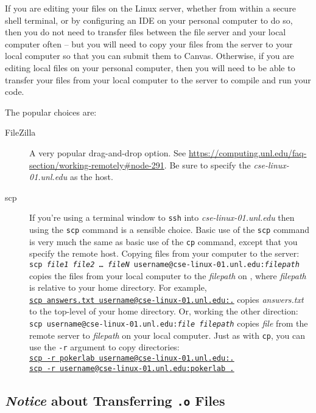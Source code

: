 If you are editing your files on the Linux server, whether from within a secure shell terminal, or by configuring an IDE on your personal computer to do so,
then you do not need to transfer files between the file server and your local computer often -- but you will need to copy your files from the server to your local computer so that you can submit them to Canvas.
Otherwise, if you are editing local files on your personal computer, then you will need to be able to transfer your files from your local computer to the server to compile and run your code.

The popular choices are:
\begin{description}
    \item[FileZilla] A very popular drag-and-drop option.
        See \url{https://computing.unl.edu/faq-section/working-remotely#node-291}.
        Be sure to specify the \textit{cse-linux-01.unl.edu} as the host.
    \item[scp] If you're using a terminal window to \texttt{ssh} into \textit{cse-linux-01.unl.edu} then using the \texttt{scp} command is a sensible choice.
        Basic use of the \texttt{scp} command is very much the same as basic use of the \texttt{cp} command, except that you specify the remote host.
        Copying files from your computer to the server: \\
        \texttt{scp \textit{file1} \textit{file2} \dots\ \textit{fileN} username@cse-linux-01.unl.edu:\textit{filepath}} copies the files from your local computer to the \textit{filepath} on \runtimeenvironment, where \textit{filepath} is relative to your home directory.
        For example, \\
        \underline{\underline{\texttt{scp answers.txt username@cse-linux-01.unl.edu:.}}} copies \textit{answers.txt} to the top-level of your home directory.
        Or, working the other direction: \\
        \texttt{scp username@cse-linux-01.unl.edu:\textit{file} \textit{filepath}} copies \textit{file} from the remote server to \textit{filepath} on your local computer.
        Just as with \texttt{cp}, you can use the \texttt{-r} argument to copy directories: \\
        \underline{\underline{\texttt{scp -r pokerlab username@cse-linux-01.unl.edu:.}}} \\
        \underline{\underline{\texttt{scp -r username@cse-linux-01.unl.edu:pokerlab .}}}
\end{description}

\subsection{\textit{Notice} about Transferring \texttt{.o} Files}

